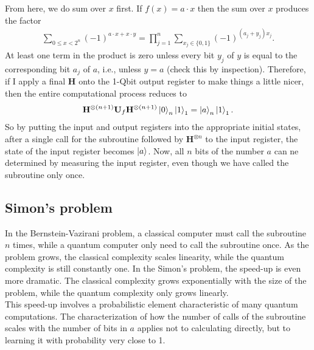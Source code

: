 \documentclass{book}
\theoremstyle{definition}
\newcommand{\U}{\mathbf{U}}
\newcommand{\had}{\mathbf{H}}
\begin{document}
From here, we do sum over $x$ first. If $f(x) = a\cdot x$ then the sum over $x$ produces the factor
\begin{align}
\sum_{0\leq x < 2^n}(-1)^{a\cdot x +  x\cdot y} = \prod_{j=1}^n \sum_{x_j\in \{0,1\}} (-1)^{(a_j + y_j)x_j}.
\end{align}
At least one term in the product is zero unless every bit $y_j$ of $y$ is equal to the corresponding bit $a_j$ of $a$, i.e., unless $y=a$ (check this by inspection). Therefore, if I apply a final $\had$ onto the 1-Qbit output register to make things a little nicer, then the entire computational process reduces to
\begin{align}
\had^{\otimes (n+1)}\U_f \had^{\otimes (n+1)}\ket{0}_n\ket{1}_1 = \ket{a}_n\ket{1}_1.
\end{align} 
So by putting the input and output registers into the appropriate initial states, after a single call for the subroutine followed by $\had^{\otimes n}$ to the input register, the state of the input register becomes $\ket{a}$. Now, all $n$ bits of the number $a$ can ne determined by measuring the input register, even though we have called the subroutine only once.













   














\subsection{Simon's problem}


In the Bernstein-Vazirani problem, a classical computer must call the subroutine $n$ times, while a quantum computer only need to call the subroutine once. As the problem grows, the classical complexity scales linearity, while the quantum complexity is still constantly one. In the Simon's problem, the speed-up is even more dramatic. The classical complexity grows exponentially with the size of the problem, while the quantum complexity only grows linearly. \\

This speed-up involves a probabilistic element characteristic of many quantum computations. The characterization of how the number of calls of the subroutine scales with the number of bits in $a$ applies not to calculating directly, but to learning it with probability very close to 1. \\
\end{document}
